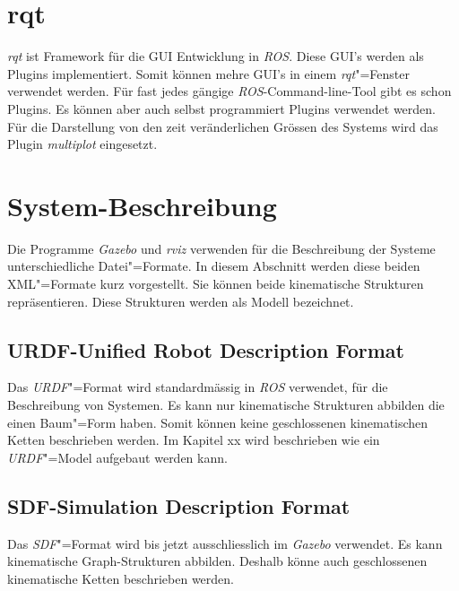 \section{rqt}
\textit{rqt} ist Framework für die GUI Entwicklung in \textit{ROS}.
Diese GUI's werden als Plugins implementiert.
Somit können mehre GUI's in einem \textit{rqt}"=Fenster verwendet werden.
Für fast jedes gängige \textit{ROS}-Command-line-Tool gibt es schon Plugins. %
Es können aber auch selbst programmiert Plugins verwendet werden. 
Für die Darstellung von den zeit veränderlichen Grössen des Systems wird das Plugin \textit{multiplot} eingesetzt. %



\section{System-Beschreibung}

Die Programme \textit{Gazebo} und \textit{rviz} verwenden für die Beschreibung der Systeme unterschiedliche Datei"=Formate.
In diesem Abschnitt werden diese beiden XML"=Formate kurz vorgestellt.
Sie können beide kinematische Strukturen repräsentieren.
Diese Strukturen werden als Modell bezeichnet.

\subsection{URDF-Unified Robot Description Format}
Das \textit{URDF}"=Format wird standardmässig in \textit{ROS} verwendet, für die Beschreibung von Systemen.
Es kann nur kinematische Strukturen abbilden die einen Baum"=Form haben.
Somit können keine geschlossenen kinematischen Ketten beschrieben werden.
Im Kapitel xx wird beschrieben wie ein \textit{URDF}"=Model aufgebaut werden kann. %

\subsection{SDF-Simulation Description Format}
Das \textit{SDF}"=Format wird bis jetzt ausschliesslich im \textit{Gazebo} verwendet.
Es kann kinematische Graph-Strukturen abbilden.
Deshalb könne auch geschlossenen kinematische Ketten beschrieben werden.

